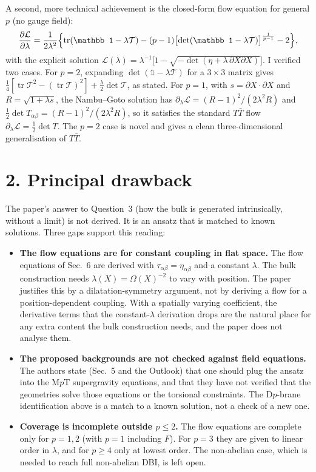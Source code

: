 \documentclass[11pt]{article}
\begin{document}
A second, more technical achievement is the closed-form flow equation for general $p$ (no gauge field):
\[
\frac{\partial\mathcal L}{\partial\lambda}=\frac{1}{2\lambda^2}\Bigl\{\operatorname{tr}(\mathbb 1-\lambda\mathcal T)-(p-1)\bigl[\det(\mathbb 1-\lambda\mathcal T)\bigr]^{\frac1{p-1}}-2\Bigr\},
\]
with the explicit solution $\mathcal L(\lambda)=\lambda^{-1}\bigl[1-\sqrt{-\det(\eta+\lambda\,\partial X\partial X)}\bigr]$. I verified two cases. For $p=2$, expanding $\det(\mathbb 1-\lambda\mathcal T)$ for a $3\times3$ matrix gives $\tfrac14[\operatorname{tr}\mathcal T^2-(\operatorname{tr}\mathcal T)^2]+\tfrac{\lambda}{2}\det\mathcal T$, as stated. For $p=1$, with $s=\partial X\!\cdot\!\partial X$ and $R=\sqrt{1+\lambda s}$, the Nambu–Goto solution has $\partial_\lambda\mathcal L=(R-1)^2/(2\lambda^2R)$ and $\tfrac12\det T_{\alpha\beta}=(R-1)^2/(2\lambda^2R)$, so it satisfies the standard $T\bar T$ flow $\partial_\lambda\mathcal L=\tfrac12\det T$. The $p=2$ case is novel and gives a clean three-dimensional generalisation of $T\bar T$.

\section*{2. Principal drawback}

The paper's answer to Question~3 (how the bulk is generated intrinsically, without a limit) is not derived. It is an ansatz that is matched to known solutions. Three gaps support this reading:

\begin{itemize}
\item \textbf{The flow equations are for constant coupling in flat space.} The flow equations of Sec.~6 are derived with $\tau_{\alpha\beta}=\eta_{\alpha\beta}$ and a constant $\lambda$. The bulk construction needs $\lambda(X)=\Omega(X)^{-2}$ to vary with position. The paper justifies this by a dilatation-symmetry argument, not by deriving a flow for a position-dependent coupling. With a spatially varying coefficient, the derivative terms that the constant-$\lambda$ derivation drops are the natural place for any extra content the bulk construction needs, and the paper does not analyse them.
\item \textbf{The proposed backgrounds are not checked against field equations.} The authors state (Sec.~5 and the Outlook) that one should plug the ansatz into the M$p$T supergravity equations, and that they have not verified that the geometries solve those equations or the torsional constraints. The D$p$-brane identification above is a match to a known solution, not a check of a new one.
\item \textbf{Coverage is incomplete outside $p\le2$.} The flow equations are complete only for $p=1,2$ (with $p=1$ including $F$). For $p=3$ they are given to linear order in $\lambda$, and for $p\ge4$ only at lowest order. The non-abelian case, which is needed to reach full non-abelian DBI, is left open.
\end{itemize}
\end{document}
